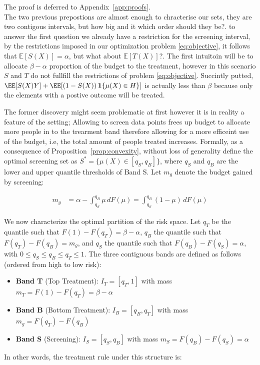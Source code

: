 The proof is deferred to Appendix~\ref{app:proofs}.\\

The two previous prepostions are almost enough to chracterise our sets, they are two contigous intervals, but how big and it which order should they be?. to answer the first question we already have a restriction for the screening interval, by the restrictions imposed in our optimization problem \ref{eq:objective}, it follows that $\mathbb{E}[S(X)] = \alpha$, but what about $\mathbb{E}[T(X)]$?. The first intuitoin will be to allocate $\beta -\alpha$ proportion of the budget to the treatment, however in this scenario $S$ and $T$ do not fullfill the restrictions of problem \ref{eq:objective}. Succintly putted, $\EE\!\left[ S(X) Y \right] + \EE\!\left[(1-S(X))\, \mathbf{1}\{\mu(X)\in H\}\right]$ is actually less than $\beta$ because only the elements with a postive outcome will be treated. 

The former discovery might seem problematic at first however it is in reality a feature of the setting; Allowing to screen data points frees up budget to allocate more people in to the trearment band therefore allowing for a more efficeint use of the budget, i.e, the total amount of people treated increases. Formally, as a consequence of Proposition~\ref{prop:convexity}, without loss of generality define the optimal screening set as $S^* = \{\mu(X) \in [q_S, q_B]\}$, where $q_S$ and $q_B$ are the lower and upper quantile thresholds of Band S. Let $m_g$ denote the budget gained by screening:

\begin{align}\label{eq:budget_savings}
       m_g &= \alpha - \int_{q_S}^{q_B} \mu \, dF(\mu) = \int_{q_S}^{q_B} (1 - \mu) \, dF(\mu)
\end{align}

We now characterize the optimal partition of the risk space. Let $q_T$ be the quantile such that $F(1) - F(q_T) = \beta - \alpha$, $q_B$ the quantile such that $F(q_T) - F(q_B) = m_g$, and $q_S$ the quantile such that $F(q_B) - F(q_S) = \alpha$, with $0 \leq q_S \leq q_B \leq q_T \leq 1$. The three contiguous bands are defined as follows (ordered from high to low risk):

\begin{itemize}
   \item \textbf{Band T} (Top Treatment): $I_T = [q_T, 1]$ with mass $m_T = F(1) - F(q_T) = \beta - \alpha$
   \item \textbf{Band B} (Bottom Treatment): $I_B = [q_B, q_T]$ with mass $m_g = F(q_T) - F(q_B)$
   \item \textbf{Band S} (Screening): $I_S = [q_S, q_B]$ with mass $m_S = F(q_B) - F(q_S) = \alpha$
\end{itemize}
In other words, the treatment rule under this structure is:


